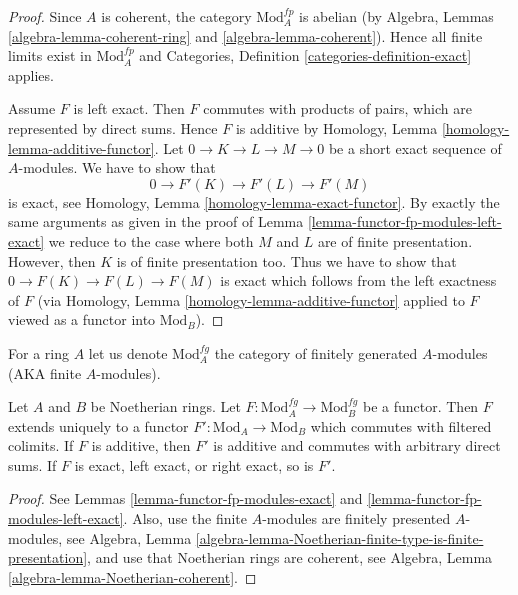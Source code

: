 \begin{proof}
Since $A$ is coherent, the category $\text{Mod}^{fp}_A$ is abelian
(by Algebra, Lemmas \ref{algebra-lemma-coherent-ring} and
\ref{algebra-lemma-coherent}). Hence all finite limits exist in
$\text{Mod}^{fp}_A$ and
Categories, Definition \ref{categories-definition-exact}
applies.

\medskip\noindent
Assume $F$ is left exact. Then $F$ commutes with products of pairs, which are
represented by direct sums. Hence $F$ is additive by
Homology, Lemma \ref{homology-lemma-additive-functor}.
Let $0 \to K \to L \to M \to 0$
be a short exact sequence of $A$-modules. We have to show that
$$
0 \to F'(K) \to F'(L) \to F'(M)
$$
is exact, see Homology, Lemma \ref{homology-lemma-exact-functor}.
By exactly the same arguments as given in the proof of
Lemma \ref{lemma-functor-fp-modules-left-exact}
we reduce to the case where both $M$ and $L$ are of finite
presentation. However, then $K$ is of finite presentation too.
Thus we have to show that
$0 \to F(K) \to F(L) \to F(M)$ is exact
which follows from the left exactness of $F$
(via Homology, Lemma \ref{homology-lemma-additive-functor}
applied to $F$ viewed as a functor into $\text{Mod}_B$).
\end{proof}

\noindent
For a ring $A$ let us denote $\text{Mod}^{fg}_A$ the category of
finitely generated $A$-modules (AKA finite $A$-modules).

\begin{lemma}
\label{lemma-functor-finite-modules}
Let $A$ and $B$ be Noetherian rings. Let
$F : \text{Mod}^{fg}_A \to \text{Mod}^{fg}_B$ be a functor.
Then $F$ extends uniquely to a functor $F' : \text{Mod}_A \to \text{Mod}_B$
which commutes with filtered colimits. If $F$ is additive, then
$F'$ is additive and commutes with arbitrary direct sums.
If $F$ is exact, left exact, or right exact, so is $F'$.
\end{lemma}

\begin{proof}
See Lemmas \ref{lemma-functor-fp-modules-exact} and
\ref{lemma-functor-fp-modules-left-exact}.
Also, use the finite $A$-modules are finitely presented $A$-modules,
see Algebra, Lemma
\ref{algebra-lemma-Noetherian-finite-type-is-finite-presentation},
and use that Noetherian rings are coherent, see
Algebra, Lemma \ref{algebra-lemma-Noetherian-coherent}.
\end{proof}

















